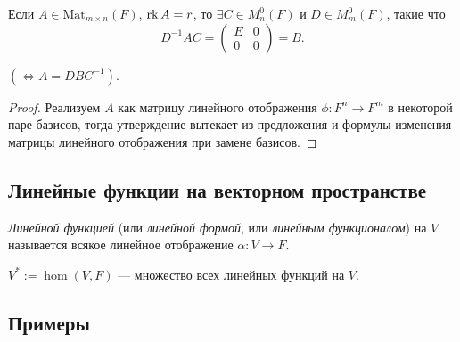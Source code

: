 \begin{corollary}
    Если $A \in \text{Mat}_{m \times n}(F)$, $\operatorname{\mathop{\mathrm{rk}}} A = r$, то $\exists C \in M_n^{0}(F)$ и $D \in M_m^{0}(F)$, такие что
    \begin{equation*}
        D^{-1}AC = \left(
            \begin{array}{c|c}
                E & 0 \\
                \hline
                0 & 0
            \end{array}
        \right) = B
    .\end{equation*}

    $(\iff A = DBC^{-1})$.
\end{corollary}

\begin{proof}
    Реализуем $A$ как матрицу линейного отображения $\phi \colon F^{n} \to F^m$ в некоторой паре базисов, тогда утверждение вытекает из предложения и формулы изменения матрицы линейного отображения при замене базисов.
\end{proof}


\subsection{Линейные функции на векторном пространстве}

\begin{definition}
    \textit{Линейной функцией} (или \textit{линейной формой}, или \textit{линейным функционалом}) на $V$ называется всякое линейное отображение $\alpha \colon V \to F$.
\end{definition}

\begin{designation}
    $V^{*} := \hom(V, F)$ --- множество всех линейных функций на $V$.
\end{designation}


\subsection{Примеры}


